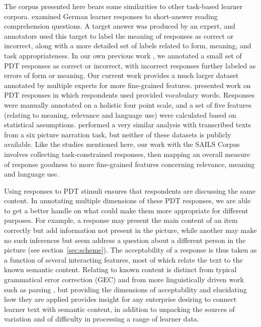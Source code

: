 \documentclass[11pt,a4paper]{article}
\begin{document}
The corpus presented here bears some similarities to other task-based learner corpora. \citet{meurers2011evaluating} examined German learner responses to short-answer reading comprehension questions. A target answer was produced by an expert, and annotators used this target to label the meaning of responses as correct or incorrect, along with a more detailed set of labels related to form, meaning, and task appropriateness. In our own previous work \citep{king:dickinson:16, king:dickinson:13}, we annotated a small set of PDT responses as correct or incorrect, with incorrect responses further labeled as errors of form or meaning. Our current work provides a much larger dataset annotated by multiple experts for more fine-grained features. \citet{somasundaran:chodorow:14} presented work on PDT responses in which respondents used provided vocabulary words. Responses were manually annotated on a holistic four point scale, and a set of five features (relating to meaning, relevance and language use) were calculated based on statistical assumptions. \citet{somasundaran:ea:15} performed a very similar analysis with transcribed texts from a six picture narration task, but neither of these datasets is publicly available. Like the studies mentioned here, our work with the SAILS Corpus involves collecting task-constrained responses, then mapping an overall measure of response goodness to more fine-grained features concerning relevance, meaning and language use. 

Using responses to PDT stimuli ensures that respondents are discussing the same content.  In  annotating multiple dimensions of these PDT responses, we are able to get a better handle on what could make them more appropriate for different purposes.  For example, a response may present the main content of an item correctly but add information not present in the picture, while another 
may make no such inferences but seem address a question about a different person in the picture (see section~\ref{sec:scheme}). The acceptability of a response is thus taken as a function of several interacting features, most of which relate the text to the known semantic content.  Relating to known content is distinct from typical grammatical error correction (GEC) \citep{leacock:ea:14} and from more linguistically driven work such as parsing \citep[e.g.,][]{cahill-et-al:14, ragheb:dickinson:14a}, but providing the dimensions of acceptability and elucidating how they are applied provides insight for any enterprise desiring to connect learner text with semantic content, in addition to unpacking the sources of variation and of difficulty in processing a range of learner data.
\end{document}
